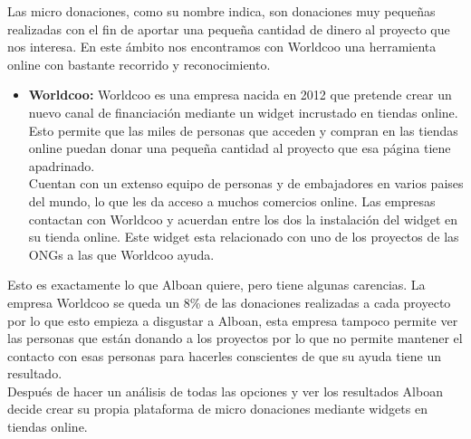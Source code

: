 Las micro donaciones, como su nombre indica, son donaciones muy pequeñas realizadas con el fin de aportar una pequeña cantidad de dinero al proyecto que nos interesa. En este ámbito nos encontramos con Worldcoo una herramienta online con bastante recorrido y reconocimiento.

\begin{itemize}
	\item \textbf{Worldcoo:} \smallbreak
	Worldcoo es una empresa nacida en 2012 que pretende crear un nuevo canal de financiación mediante un widget incrustado en tiendas online. Esto permite que las miles de personas que acceden y compran en las tiendas online puedan donar una pequeña cantidad al proyecto que esa página tiene apadrinado.\\
	Cuentan con un extenso equipo de personas y de embajadores en varios paises del mundo, lo que les da acceso a muchos comercios online. Las empresas contactan con Worldcoo y acuerdan entre los dos la instalación del widget en su tienda online. Este widget esta relacionado con uno de los proyectos de las ONGs a las que Worldcoo ayuda.
\end{itemize}

Esto es exactamente lo que Alboan quiere, pero tiene algunas carencias. La empresa Worldcoo se queda un 8\% de las donaciones realizadas a cada proyecto por lo que esto empieza a disgustar a Alboan, esta empresa tampoco permite ver las personas que están donando a los proyectos por lo que no permite mantener el contacto con esas personas para hacerles conscientes de que su ayuda tiene un resultado. \\

Después de hacer un análisis de todas las opciones y ver los resultados Alboan decide crear su propia plataforma de micro donaciones mediante widgets en tiendas online.
